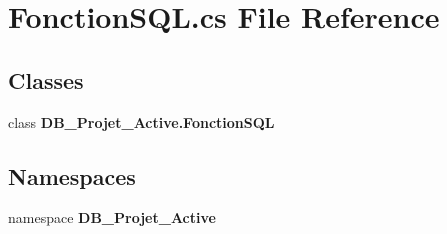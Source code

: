 \section{Fonction\+S\+Q\+L.\+cs File Reference}
\label{_fonction_s_q_l_8cs}
\subsection*{Classes}
\begin{DoxyCompactItemize}
\item 
class \textbf{ D\+B\+\_\+\+Projet\+\_\+\+Active.\+Fonction\+S\+QL}
\end{DoxyCompactItemize}
\subsection*{Namespaces}
\begin{DoxyCompactItemize}
\item 
namespace \textbf{ D\+B\+\_\+\+Projet\+\_\+\+Active}
\end{DoxyCompactItemize}
